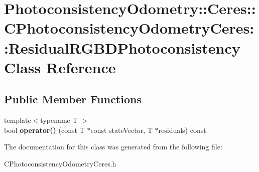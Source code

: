 \hypertarget{class_photoconsistency_odometry_1_1_ceres_1_1_c_photoconsistency_odometry_ceres_1_1_residual_r_g_b_d_photoconsistency}{
\section{PhotoconsistencyOdometry::Ceres::CPhotoconsistencyOdometryCeres::ResidualRGBDPhotoconsistency Class Reference}
\label{class_photoconsistency_odometry_1_1_ceres_1_1_c_photoconsistency_odometry_ceres_1_1_residual_r_g_b_d_photoconsistency}
}
\subsection*{Public Member Functions}
\begin{DoxyCompactItemize}
\item 
\hypertarget{class_photoconsistency_odometry_1_1_ceres_1_1_c_photoconsistency_odometry_ceres_1_1_residual_r_g_b_d_photoconsistency_a2a16cbc3f15bb2e3232c29b66fd313ed}{
{\footnotesize template$<$typename T $>$ }\\bool {\bfseries operator()} (const T $\ast$const stateVector, T $\ast$residuals) const }
\label{class_photoconsistency_odometry_1_1_ceres_1_1_c_photoconsistency_odometry_ceres_1_1_residual_r_g_b_d_photoconsistency_a2a16cbc3f15bb2e3232c29b66fd313ed}

\end{DoxyCompactItemize}


The documentation for this class was generated from the following file:\begin{DoxyCompactItemize}
\item 
CPhotoconsistencyOdometryCeres.h\end{DoxyCompactItemize}
